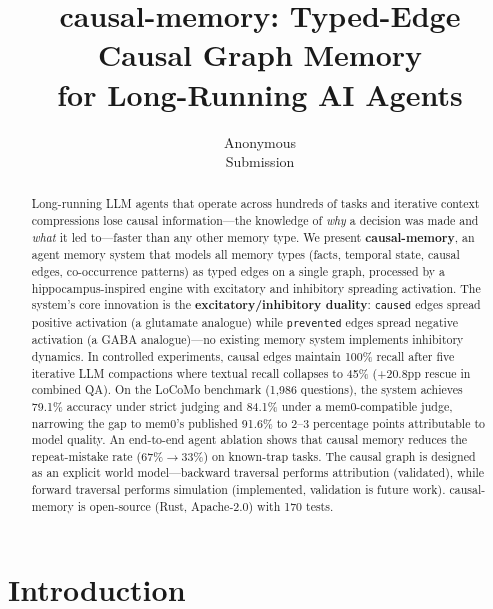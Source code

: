 \documentclass[letterpaper,twocolumn,10pt]{article}
\begin{document}
\date{}

\title{\Large \bf causal-memory: Typed-Edge Causal Graph Memory\\for Long-Running AI Agents}

\author{
{\rm Anonymous}\\
Submission
}

\maketitle

\begin{abstract}
Long-running LLM agents that operate across hundreds of tasks and iterative context compressions lose causal information---the knowledge of \emph{why} a decision was made and \emph{what} it led to---faster than any other memory type. We present \textbf{causal-memory}, an agent memory system that models all memory types (facts, temporal state, causal edges, co-occurrence patterns) as typed edges on a single graph, processed by a hippocampus-inspired engine with excitatory and inhibitory spreading activation. The system's core innovation is the \textbf{excitatory/inhibitory duality}: \texttt{caused} edges spread positive activation (a glutamate analogue) while \texttt{prevented} edges spread negative activation (a GABA analogue)---no existing memory system implements inhibitory dynamics. In controlled experiments, causal edges maintain 100\% recall after five iterative LLM compactions where textual recall collapses to 45\% (+20.8pp rescue in combined QA). On the LoCoMo benchmark (1,986 questions), the system achieves 79.1\% accuracy under strict judging and 84.1\% under a mem0-compatible judge, narrowing the gap to mem0's published 91.6\% to 2--3 percentage points attributable to model quality. An end-to-end agent ablation shows that causal memory reduces the repeat-mistake rate (67\%$\rightarrow$33\%) on known-trap tasks. The causal graph is designed as an explicit world model---backward traversal performs attribution (validated), while forward traversal performs simulation (implemented, validation is future work). causal-memory is open-source (Rust, Apache-2.0) with 170 tests.
\end{abstract}

\section{Introduction}
\label{sec:intro}
\end{document}
